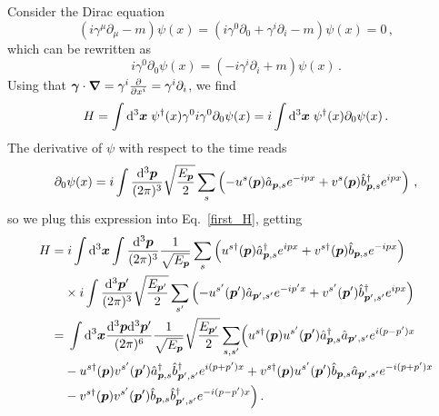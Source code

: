 \begin{sol}
    Consider the Dirac equation
    \begin{equation}
        \left( i \gamma^\mu \partial_\mu -m\right) \psi(x) = \left( i \gamma^0 \partial_0 + \gamma^i \partial_i -m\right) \psi(x) = 0\,,
    \end{equation}
    which can be rewritten as
    \begin{equation}
        i \gamma^0 \partial_0 \psi(x) = \left( -i \gamma^i \partial_i + m \right) \psi(x)\,.
    \end{equation}
    Using that $\boldsymbol{\gamma} \cdot \boldsymbol{\nabla}= \gamma^i \frac{\partial}{\partial x^i}=\gamma^i \partial_i$, we find
    \begin{equation}
    \label{first_H}
        H=\int {\rm d}^3 \boldsymbol{x} \;\psi^\dagger(x) \gamma^0 i \gamma^0 \partial_0 \psi(x) = i \int{\rm d}^3\boldsymbol{x} \; \psi^\dagger(x) \partial_0 \psi(x)\,.
    \end{equation}
    The derivative of $\psi$ with respect to the time reads
    \begin{equation}
        \partial_0 \psi(x) = i \int \frac{{\rm d}^3\boldsymbol{p}}{(2\pi)^3}\sqrt{\frac{E_{\boldsymbol{p}}}{2}} \sum_s \left( - u^s(\boldsymbol{p}) \hat{a}_{\boldsymbol{p},s} e^{-ipx} + v^s(\boldsymbol{p}) \hat{b}^\dagger_{\boldsymbol{p}, s} e^{ipx} \right) \,,
    \end{equation}
    so we plug this expression into Eq.~\eqref{first_H}, getting
    \begin{equation}
    \begin{split}
        H = &\; i \int \rmd^3 \vx \int \frac{\rmd^3 \vp}{(2\pi)^3}\frac{1}{\sqrt{\Ep}} \sum_s \left( u^{s\dagger}(\vp) \acon_{\vp,s} e^{ipx} + v^{s\dagger}(\vp) \bdes_{\vp,s} e^{-ipx} \right) \\
        & \times i \int \frac{\rmd^3 \vp'}{(2\pi)^3}\sqrt{\frac{E_{\vp'}}{2}} \sum_{s'} \left( -u^{s'}(\vp') \ades_{\vp',s'} e^{-ip'x} + v^{s'}(\vp') \bcon_{\vp',s'} e^{ipx} \right) \\
        = &\; \int \rmd^3 \vx \frac{\rmd^3\vp \rmd^3\vp'}{(2\pi)^6} \frac{1}{\sqrt{\Ep}} \sqrt{\frac{E_{\vp'}}{2}} \sum_{s,s'} \Bigl( u^{s\dagger}(\vp) u^{s'}(\vp') \acon_{\vp, s}\ades_{\vp', s'} e^{i(p-p')x} \\
        &- u^{s\dagger}(\vp) v^{s'}(\vp') \acon_{\vp, s}\bcon_{\vp', s'} e^{i(p+p')x} + v^{s\dagger}(\vp) u^{s'}(\vp') \bdes_{\vp, s}\ades_{\vp', s'} e^{-i(p+p')x}  \\
        & -v^{s\dagger}(\vp) v^{s'}(\vp') \bdes_{\vp, s}\bcon_{\vp', s'} e^{-i(p-p')x}
        \Bigr)\,.
    \end{split}

\end{equation}
\end{sol}
